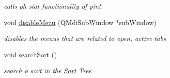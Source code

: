 \begin{DoxyCompactItemize}
\begin{DoxyCompactList}\small\item\em calls ph-\/stat functionality of pint \end{DoxyCompactList}\item 
void \hyperlink{class_main_window_a5f56ea1ee38eb16074e654b8bd52d072}{disable\-Menu} (\-Q\-Mdi\-Sub\-Window $\ast$sub\-Window)
\begin{DoxyCompactList}\small\item\em disables the menus that are related to open, active tabs \end{DoxyCompactList}\item 
\hypertarget{class_main_window_a3fbd0b3e2fb9008ffa476d79a951d3dd}{void \hyperlink{class_main_window_a3fbd0b3e2fb9008ffa476d79a951d3dd}{search\-Sort} ()}\label{class_main_window_a3fbd0b3e2fb9008ffa476d79a951d3dd}

\begin{DoxyCompactList}\small\item\em search a sort in the \hyperlink{class_sort}{\-Sort} \-Tree \end{DoxyCompactList}\end{DoxyCompactItemize}
